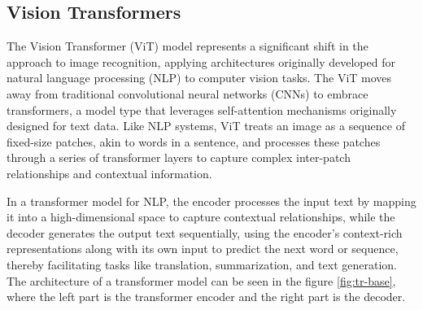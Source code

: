 \subsection{Vision Transformers}

The Vision Transformer (ViT) \cite{visiontr} model represents a significant shift in the approach to image recognition, applying architectures originally developed for 
natural language processing (NLP) to computer vision tasks. The ViT moves away from traditional convolutional neural networks (CNNs) to embrace transformers, 
a model type that leverages self-attention mechanisms originally designed for text data. Like NLP systems, ViT treats an image as a sequence of 
fixed-size patches, akin to words in a sentence, and processes these patches through a series of transformer layers to capture complex inter-patch 
relationships and contextual information.

In a transformer model for NLP, the encoder processes the input text by mapping it into a high-dimensional space to capture contextual relationships, while the 
decoder generates the output text sequentially, using the encoder's context-rich representations along with its own input to predict the next word or 
sequence, thereby facilitating tasks like translation, summarization, and text generation. The architecture of a transformer model can be seen in the 
figure \ref{fig:tr-base}, where the left part is the transformer encoder and the right part is the decoder.


